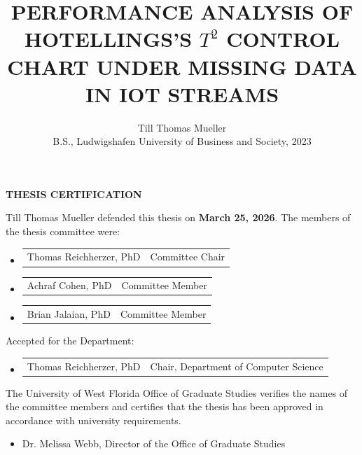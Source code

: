 \documentclass[book,onecolumn, 12pt]{IEEEtran}
\title{PERFORMANCE ANALYSIS OF HOTELLINGS'S $T^2$ CONTROL CHART UNDER MISSING DATA IN IOT STREAMS}
\author{Till Thomas Mueller\\
B.S., Ludwigshafen University of Business and Society, 2023}
\begin{document}
\renewcommand{\chaptername}{CHAPTER} 
\renewcommand{\contentsname}{TABLE OF CONTENTS} 
\renewcommand{\listfigurename}{LIST OF FIGURES}
\renewcommand{\listtablename}{LIST OF TABLES}


\maketitle
\frontmatter
{}

\clearpage
\thispagestyle{empty}
\begin{center}
    \textbf{THESIS CERTIFICATION}
\end{center}
\begin{singlespace}
\noindent
 Till Thomas Mueller defended this thesis on \textbf{March 25, 2026}. The members of the thesis committee were:

\begin{itemize}
    \setlength\itemsep{-0.5em}

    \item[] \noindent
    \begin{tabular}{@{}p{8cm} l@{}}
        Thomas Reichherzer, PhD & Committee Chair
    \end{tabular}
    \vspace{0.5\baselineskip}

    \item[] \noindent
    \begin{tabular}{@{}p{8cm} l@{}}
        Achraf Cohen, PhD & Committee Member
    \end{tabular}
    \vspace{0.5\baselineskip}

    \item[] \noindent
    \begin{tabular}{@{}p{8cm} l@{}}
        Brian Jalaian, PhD & Committee Member
    \end{tabular}
\end{itemize}



\vspace{1.0cm}

\noindent Accepted for the Department:
\begin{itemize}
  \item[] \noindent
  \begin{tabular}{@{}p{8cm} l@{}}
    Thomas Reichherzer, PhD & Chair, Department of Computer Science
  \end{tabular}
\end{itemize}


\vspace{1.0cm}

\noindent The University of West Florida Office of Graduate Studies verifies the names of the committee members and certifies that the thesis has been approved in accordance with university requirements.
\end{singlespace}
\begin{itemize}
    \item[] \noindent Dr. Melissa Webb, Director of the Office of Graduate Studies
\end{itemize}
\end{document}
